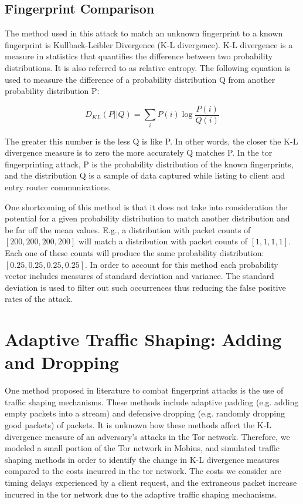 \documentclass{usenixsubmit}
\begin{document}
\subsection{Fingerprint Comparison}
The method used in this attack to match an unknown fingerprint to a known 
fingerprint is Kullback-Leibler Divergence (K-L divergence). K-L divergence 
is a measure in statistics that quantifies the difference between two 
probability distributions. It is also referred to as relative entropy. The 
following equation is used to measure the difference of a probability 
distribution Q from another probability distribution P: 

\[ D_{KL}(P||Q) = \sum_i P(i)\log\frac{P(i)}{Q(i)}\]

The greater this number is the less Q is like P. In other words, the closer 
the K-L divergence measure is to zero the more accurately Q matches P. In the 
tor fingerprinting attack, P is the probability distribution of the known 
fingerprints, and the distribution Q is a sample of data captured while listing 
to client and entry router communications. 

One shortcoming of this method is that it does not take into consideration 
the potential for a given probability distribution to match another 
distribution and be far off the mean values. E.g., a distribution with packet
counts of $[200,200,200,200]$ will match a distribution with packet counts of
$[1,1,1,1]$. Each one of these counts will produce the same probability 
distribution: $[0.25,0.25,0.25,0.25]$. In order to account for this method 
each probability vector includes 
measures of standard deviation and variance. The standard deviation is used 
to filter out such occurrences thus reducing the false positive rates of the attack.

\section{Adaptive Traffic Shaping: Adding and Dropping}
One method proposed in literature to combat fingerprint attacks is the use 
of traffic shaping mechanisms. These methods include adaptive padding (e.g. 
adding empty packets into a stream) and defensive dropping (e.g. randomly 
dropping good packets) of packets. It is unknown how these methods affect the 
K-L divergence measure of an adversary's attacks in the Tor network. Therefore, 
we modeled a small portion of the Tor network in Mobius, and simulated
traffic shaping methods in order to identify the change in K-L divergence 
measures compared to the costs incurred in the tor network. The costs we 
consider are timing delays experienced by a client request, and the extraneous 
packet increase incurred in the tor network due to the adaptive traffic shaping 
mechanisms. 
\end{document}

